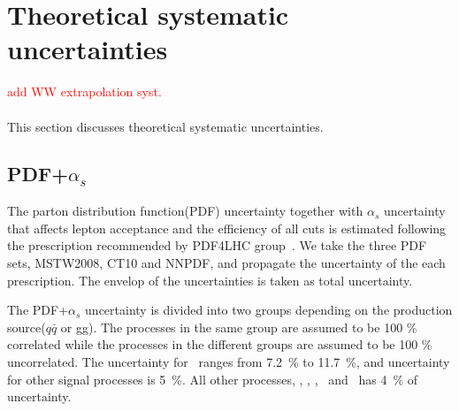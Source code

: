 \section{Theoretical systematic uncertainties}

\textcolor{red}{add WW extrapolation syst.} \\ \\ 

This section discusses theoretical systematic uncertainties. 

\subsection{PDF+$\alpha_s$}

The parton distribution function(PDF) uncertainty together with $\alpha_s$ uncertainty 
that affects lepton acceptance and the efficiency of all cuts 
is estimated following the prescription recommended by PDF4LHC group~\cite{}. 
We take the three PDF sets, MSTW2008, CT10 and NNPDF, 
and propagate the uncertainty of the each prescription. 
The envelop of the uncertainties is taken as total uncertainty. 

The PDF+$\alpha_s$ uncertainty is divided into two groups depending on the 
production source($q\bar{q}$ or gg). 
The processes in the same group are assumed to be 100 \% correlated 
while the processes in the different groups are assumed to be 100 \% uncorrelated.
The uncertainty for \ggH\ ranges from 7.2~\% to 11.7~\%,  
and uncertainty for other signal processes is 5~\%.
All other processes, \ggww, \qqww, \vv, \wgamma\ and \wgammastar\  has 4~\% of uncertainty.

